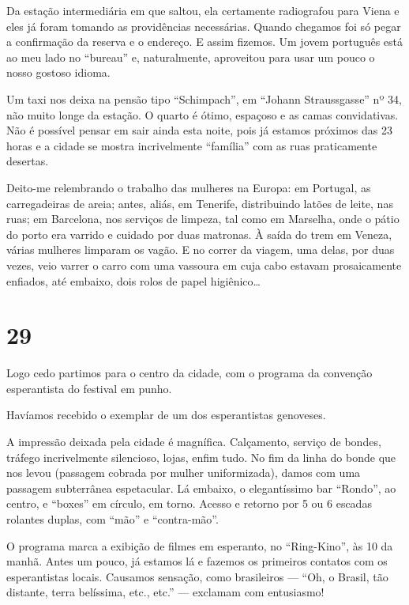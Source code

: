 Da estação intermediária em que saltou, ela certamente radiografou para Viena e eles já foram tomando as providências necessárias. Quando chegamos foi só pegar a confirmação da reserva e o endereço. E assim fizemos. Um jovem português está ao meu lado no ``bureau'' e, naturalmente, aproveitou para usar um pouco o nosso gostoso idioma.

Um taxi nos deixa na pensão tipo ``Schimpach'', em ``Johann Straussgasse'' nº 34, não muito longe da estação. O quarto é ótimo, espaçoso e as camas convidativas. Não é possível pensar em sair ainda esta noite, pois já estamos próximos das 23 horas e a cidade se mostra incrivelmente ``família'' com as ruas praticamente desertas.

Deito-me relembrando o trabalho das mulheres na Europa: em Portugal, as carregadeiras de areia; antes, aliás, em Tenerife, distribuindo latões de leite, nas ruas; em Barcelona, nos serviços de limpeza, tal como em Marselha, onde o pátio do porto era varrido e cuidado por duas matronas. À saída do trem em Veneza, várias mulheres limparam os vagão. E no correr da viagem, uma delas, por duas vezes, veio varrer o carro com uma vassoura em cuja cabo estavam prosaicamente enfiados, até embaixo, dois rolos de papel higiênico\ldots

\section*{29 \adfflatleafright {}}
Logo cedo partimos para o centro da cidade, com o programa da convenção esperantista do festival em punho.

Havíamos recebido o exemplar de um dos esperantistas genoveses.

A impressão deixada pela cidade é magnífica. Calçamento, serviço de bondes, tráfego incrivelmente silencioso, lojas, enfim tudo. No fim da linha do bonde que nos levou (passagem cobrada por mulher uniformizada), damos com uma passagem subterrânea espetacular. Lá embaixo, o elegantíssimo bar ``Rondo'', ao centro, e ``boxes'' em círculo, em torno. Acesso e retorno por 5 ou 6 escadas rolantes duplas, com ``mão'' e ``contra-mão''.

O programa marca a exibição de filmes em esperanto, no ``Ring-Kino'', às 10 da manhã. Antes um pouco, já estamos lá e fazemos os primeiros contatos com os esperantistas locais. Causamos sensação, como brasileiros --- ``Oh, o Brasil, tão distante, terra belíssima, etc., etc.'' --- exclamam com entusiasmo!

